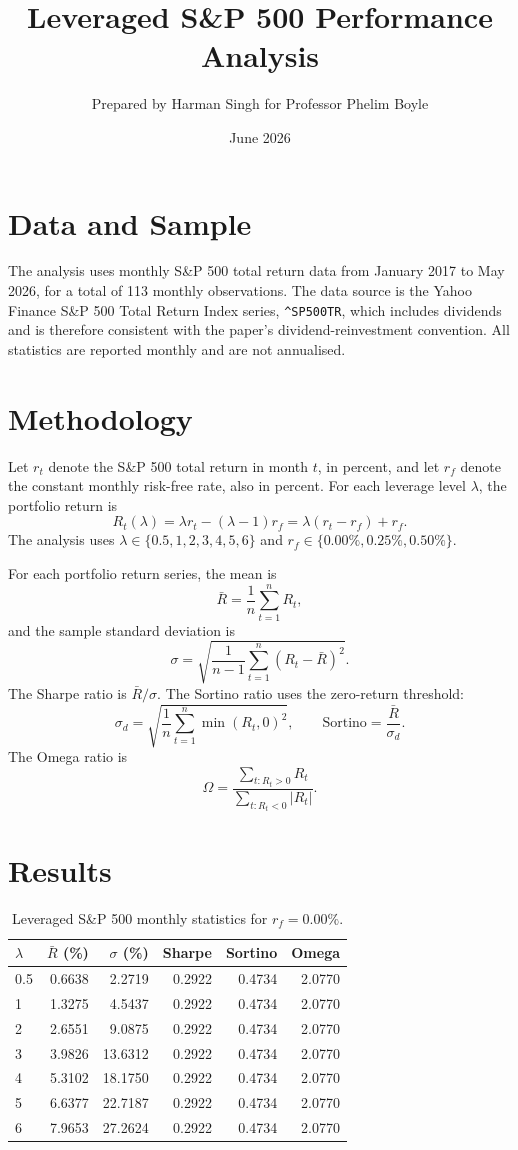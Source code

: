 \documentclass[11pt]{article}
\title{Leveraged S\&P 500 Performance Analysis}
\author{Prepared by Harman Singh for Professor Phelim Boyle}
\date{June 2026}
\begin{document}
\maketitle

\section*{Data and Sample}
The analysis uses monthly S\&P 500 total return data from January 2017 to May 2026, for a total of 113 monthly observations.
The data source is the Yahoo Finance S\&P 500 Total Return Index series, \texttt{\string^SP500TR}, which includes dividends and is therefore consistent with the paper's dividend-reinvestment convention.
All statistics are reported monthly and are not annualised.

\section*{Methodology}
Let $r_t$ denote the S\&P 500 total return in month $t$, in percent, and let $r_f$ denote the constant monthly risk-free rate, also in percent.
For each leverage level $\lambda$, the portfolio return is
\[
R_t(\lambda)=\lambda r_t-(\lambda-1)r_f=\lambda(r_t-r_f)+r_f.
\]
The analysis uses $\lambda \in \{0.5,1,2,3,4,5,6\}$ and $r_f \in \{0.00\%,0.25\%,0.50\%\}$.

For each portfolio return series, the mean is
\[
\bar{R}=\frac{1}{n}\sum_{t=1}^n R_t,
\]
and the sample standard deviation is
\[
\sigma=\sqrt{\frac{1}{n-1}\sum_{t=1}^n (R_t-\bar{R})^2}.
\]
The Sharpe ratio is $\bar{R}/\sigma$.
The Sortino ratio uses the zero-return threshold:
\[
\sigma_d=\sqrt{\frac{1}{n}\sum_{t=1}^n \min(R_t,0)^2},
\qquad
\mathrm{Sortino}=\frac{\bar{R}}{\sigma_d}.
\]
The Omega ratio is
\[
\Omega=\frac{\sum_{t:R_t>0} R_t}{\sum_{t:R_t<0} |R_t|}.
\]

\section*{Results}
\begin{table}[H]
\centering
\caption{Leveraged S\&P 500 monthly statistics for $r_f=0.00\%$.}
\label{tab:rf-00}
\begin{tabular}{lrrrrr}
\toprule
$\lambda$ & $\bar{R}$ (\%) & $\sigma$ (\%) & Sharpe & Sortino & Omega \\
\midrule
0.5 & 0.6638 & 2.2719 & 0.2922 & 0.4734 & 2.0770 \\
1 & 1.3275 & 4.5437 & 0.2922 & 0.4734 & 2.0770 \\
2 & 2.6551 & 9.0875 & 0.2922 & 0.4734 & 2.0770 \\
3 & 3.9826 & 13.6312 & 0.2922 & 0.4734 & 2.0770 \\
4 & 5.3102 & 18.1750 & 0.2922 & 0.4734 & 2.0770 \\
5 & 6.6377 & 22.7187 & 0.2922 & 0.4734 & 2.0770 \\
6 & 7.9653 & 27.2624 & 0.2922 & 0.4734 & 2.0770 \\
\bottomrule
\end{tabular}
\end{table}
\end{document}

